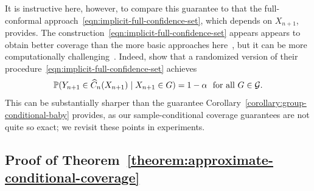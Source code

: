 \documentclass[11pt]{article}
\newcommand{\scorefunc}{s}
\newcommand{\scoreval}{\scorefunc}
\begin{document}
It is instructive here, however,
to compare this guarantee to
that the
full-conformal approach~\eqref{eqn:implicit-full-confidence-set},
which depends on $X_{n+1}$, provides.
%
The construction~\eqref{eqn:implicit-full-confidence-set} appears
appears to obtain better coverage than the more basic approaches
here~\cite[Fig.~3]{GibbsChCa23}, but it can be more
computationally challenging~\cite[Fig.~6]{GibbsChCa23}.
%
Indeed, \citet{GibbsChCa23} show that a randomized version of their
procedure~\eqref{eqn:implicit-full-confidence-set} achieves
\begin{equation*}
  \mathbb{P}(Y_{n + 1} \in \widehat{C}_n(X_{n+1}) \mid X_{n + 1} \in G)
  = 1 - \alpha ~~ \mbox{for~all~} G \in \mathcal{G}.
\end{equation*}
%
This can be substantially sharper than the guarantee
Corollary~\ref{corollary:group-conditional-baby} provides, as our
sample-conditional coverage guarantees are not quite so exact; we revisit
these points in experiments.

\subsection{Proof of Theorem~\ref{theorem:approximate-conditional-coverage}}
\label{sec:proof-approximate-conditional-coverage}
\end{document}
